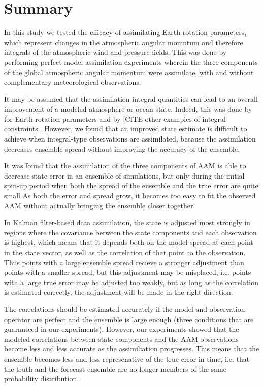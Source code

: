 \section{Summary}  

In this study we tested the efficacy of assimilating Earth rotation parameters, which represent changes in the atmospheric angular momntum and therefore integrals of the atmospheric wind and pressure fields.  
This was done by performing perfect model assimilation experiments wherein the three components of the global atmospheric angular momentum were assimilate, with and without complementary meteorological observations. 

It may be assumed that the assimilation integral quantities can lead to an overall improvement of a modeled atmosphere or ocean state.
Indeed, this was done by \citet{Saynisch2010,Saynisch2011,Saynisch2012} for Earth rotation parameters and by \textcolor{alert}{[CITE other examples of integral constraints]}.
However, we found that an improved state estimate is difficult to achieve when integral-type observations are assimilated, \textcolor{unsure}{because the assimilation decreases ensemble spread without improving the accuracy of the ensemble.}


It was found that the assimilation of the three components of AAM is able to decrease state error in an ensemble of simulations, but only during the initial spin-up period when both  the spread of the ensemble and the true error are quite small
As both the error and spread grow, it becomes too easy to fit the observed AAM without actually bringing the ensemble closer together.

In Kalman filter-based data assimilation, the state is adjusted most strongly in regions where the covariance between the state components and each observation is highest, which means that it depends both on the model spread at each point in the state vector, as well as the correlation of that point to the observation.  
Thus points with a large ensemble spread recieve a stronger adjustment than points with a smaller spread, but this adjustment may be misplaced, i.e. points with a large true error may be adjusted too weakly, but as long as the correlation is estimated correctly, the adjustment will be made in the right direction.  

\textcolor{unsure}{The correlations should be estimated accurately if the model and observation operator are perfect and the ensemble is large enough (three conditions that are guaranteed in our experiments).  
However, our experiments showed that the modeled correlations between state components and the AAM observations become less and less accurate as the assimiliation progresses. 
This means that the ensemble becomes less and less represenative of the true error in time, i.e. that the truth and the forecast ensemble are no longer members of the same probability distribution. 
 }



